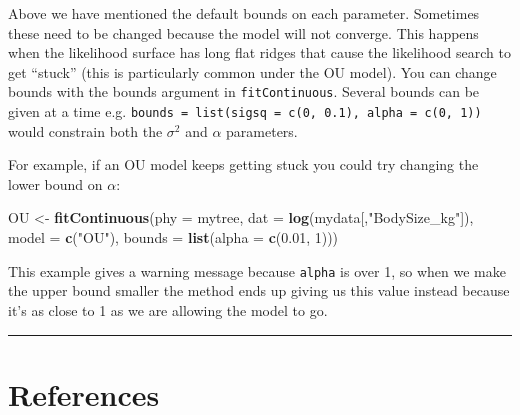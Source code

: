 \documentclass[]{book}
\newenvironment{Shaded}{\begin{snugshade}}{\end{snugshade}}
\newcommand{\KeywordTok}[1]{\textcolor[rgb]{0.13,0.29,0.53}{\textbf{{#1}}}}
\newcommand{\DataTypeTok}[1]{\textcolor[rgb]{0.13,0.29,0.53}{{#1}}}
\newcommand{\DecValTok}[1]{\textcolor[rgb]{0.00,0.00,0.81}{{#1}}}
\newcommand{\FloatTok}[1]{\textcolor[rgb]{0.00,0.00,0.81}{{#1}}}
\newcommand{\StringTok}[1]{\textcolor[rgb]{0.31,0.60,0.02}{{#1}}}
\newcommand{\NormalTok}[1]{{#1}}
\begin{document}
Above we have mentioned the default bounds on each parameter. Sometimes
these need to be changed because the model will not converge. This
happens when the likelihood surface has long flat ridges that cause the
likelihood search to get ``stuck'' (this is particularly common under
the OU model). You can change bounds with the bounds argument in
\texttt{fitContinuous}. Several bounds can be given at a time e.g.
\texttt{bounds\ =\ list(sigsq\ =\ c(0,\ 0.1),\ alpha\ =\ c(0,\ 1))}
would constrain both the \(\sigma^2\) and \(\alpha\) parameters.

For example, if an OU model keeps getting stuck you could try changing
the lower bound on \(\alpha\):

\begin{Shaded}
\begin{Highlighting}[]
\NormalTok{OU <-}\StringTok{ }\KeywordTok{fitContinuous}\NormalTok{(}\DataTypeTok{phy =} \NormalTok{mytree, }\DataTypeTok{dat =} \KeywordTok{log}\NormalTok{(mydata[,}\StringTok{"BodySize_kg"}\NormalTok{]), }\DataTypeTok{model =} \KeywordTok{c}\NormalTok{(}\StringTok{"OU"}\NormalTok{), }
                    \DataTypeTok{bounds =} \KeywordTok{list}\NormalTok{(}\DataTypeTok{alpha =} \KeywordTok{c}\NormalTok{(}\FloatTok{0.01}\NormalTok{, }\DecValTok{1}\NormalTok{)))}
\end{Highlighting}
\end{Shaded}

This example gives a warning message because \texttt{alpha} is over 1,
so when we make the upper bound smaller the method ends up giving us
this value instead because it's as close to 1 as we are allowing the
model to go.

\begin{center}\rule{0.5\linewidth}{\linethickness}\end{center}

\section{References}\label{references-2}
\end{document}
